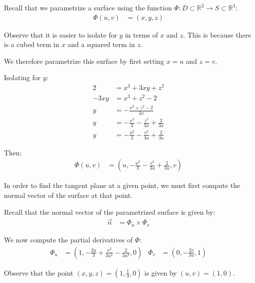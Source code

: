 \begin{solution}
    Recall that we parametrize a surface using the function \(\Phi: D \subset \mathbb{R}^2 \rightarrow S \subset \mathbb{R}^3\):
    \begin{align}
        \Phi(u, v) &= (x, y, z)
    \end{align}
    
    Observe that it is easier to isolate for \(y\) in terms of \(x\) and \(z\). This is because there is a cubed term in \(x\) and a squared term in \(z\).
    
    We therefore parametrize this surface by first setting \(x = u\) and \(z = v\).
    
    Isolating for \(y\):
    \begin{align*}
        2 &= x^3 + 3xy + z^2 \\
        -3xy &= x^3 + z^2 - 2 \\
        y &= -\frac{x^3 + z^2 - 2}{3x} \\
        y &= -\frac{x^2}{3} - \frac{z^2}{3x} + \frac{2}{3x} \\
        y &= -\frac{u^2}{3} - \frac{v^2}{3u} + \frac{2}{3u}
    \end{align*}
    
    Then:
    \begin{align}
        \Phi(u, v) &= \left(u, -\frac{u^2}{3} - \frac{v^2}{3u} + \frac{2}{3u}, v\right)
    \end{align}
    
    In order to find the tangent plane at a given point, we must first compute the normal vector of the surface at that point.
    
    Recall that the normal vector of the parametrized surface is given by:
    \begin{align}
        \vec{n} &= \Phi_u \times \Phi_v
    \end{align}
    
    We now compute the partial derivatives of \(\Phi\):
    \begin{align}
        \Phi_u &= \left(1, -\frac{2u}{3} + \frac{v^2}{3u^2} - \frac{2}{3u^2}, 0\right) & \Phi_v &= \left(0, - \frac{2v}{3u}, 1\right)
    \end{align}
    
    Observe that the point \((x, y, z) = \left(1, \frac{1}{3}, 0\right)\) is given by \((u, v) = (1, 0)\).
    

\end{solution}
